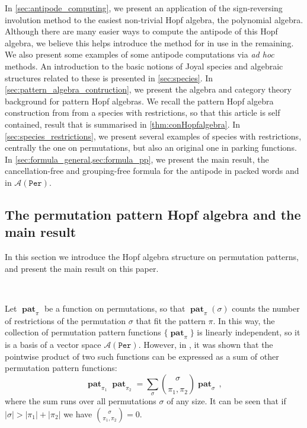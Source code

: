 \documentclass[12pt, reqno]{amsart}
\theoremstyle{definition}
\DeclareMathOperator{\pat}{\mathbf{pat}}
\begin{document}
In \cref{sec:antipode_computing}, we present an application of the sign-reversing involution method to the easiest non-trivial Hopf algebra, the polynomial algebra.
Although there are many easier ways to compute the antipode of this Hopf algebra, we believe this helps introduce the method for in use in the remaining.
We also present some examples of some antipode computations via \textit{ad hoc} methods. An introduction to the basic notions of Joyal species and algebraic structures related to these is presented in \cref{sec:species}. In \cref{sec:pattern_algebra_contruction}, we present the algebra and category theory background for pattern Hopf algebras. We recall the pattern Hopf algebra construction from \cite{Penaguiao2020} from a species with restrictions, so that this article is self contained, result that is summarised in \cref{thm:conHopfalgebra}.
In \cref{sec:species_restrictions}, we present several examples of species with restrictions, centrally the one on permutations, but also an original one in parking functions.
In \cref{sec:formula_general,sec:formula_pp}, we present the main result, the cancellation-free and grouping-free formula for the antipode in packed words and in $\mathcal{A}(\mathtt{Per})$.
\subsection{The permutation pattern Hopf algebra and the main result}

In this section we introduce the Hopf algebra structure on permutation patterns, and present the main result on this paper.

\

Let $\pat_{\pi}$ be a function on permutations, so that $\pat_{\pi}(\sigma)$ counts the number of restrictions of the permutation $\sigma$ that fit the pattern $\pi$.
In this way, the collection of permutation pattern functions $\{\pat_{\pi}\}$ is linearly independent, so it is a basis of a vector space $\mathcal A (\mathtt{Per})$.
However, in \cite{Vargas}, it was shown that the pointwise product of two such functions can be expressed as a sum of other permutation pattern functions:
\begin{equation}\label{eq:prodperm}
\pat_{\pi_1} \pat_{\pi_2} = \sum_{\sigma} \binom{\sigma}{\pi_1, \pi_2} \pat_{\sigma} \, ,
\end{equation}
where the sum runs over all permutations $\sigma$ of any size.
It can be seen that if $|\sigma| > |\pi_1| + |\pi_2|$ we have $\binom{\sigma}{\pi_1, \pi_2} = 0$.
\end{document}
